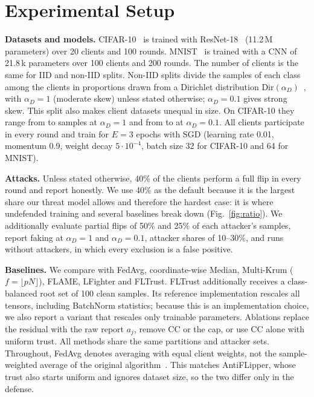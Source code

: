 \documentclass[conference]{IEEEtran}
\begin{document}
\section{Experimental Setup}
\label{sec:setup}
\textbf{Datasets and models.} CIFAR-10~\cite{CIFAR-krizhevsky2009learning} is trained with ResNet-18~\cite{resnet-he2016deep} (11.2\,M parameters) over 20 clients and 100 rounds. MNIST~\cite{MNIST-lecun1998gradient} is trained with a CNN of 21.8\,k parameters over 100 clients and 200 rounds. The number of clients is the same for IID and non-IID splits. Non-IID splits divide the samples of each class among the clients in proportions drawn from a Dirichlet distribution $\mathrm{Dir}(\alpha_D)$~\cite{ferguson1973bayesian}, with $\alpha_D{=}1$ (moderate skew) unless stated otherwise; $\alpha_D{=}0.1$ gives strong skew. This split also makes client datasets unequal in size. On CIFAR-10 they range from \sizeHighMin{} to \sizeHighMax{} samples at $\alpha_D{=}1$ and from \sizeLowMin{} to \sizeLowMax{} at $\alpha_D{=}0.1$. All clients participate in every round and train for $E{=}3$ epochs with SGD (learning rate 0.01, momentum 0.9, weight decay $5\cdot10^{-4}$, batch size 32 for CIFAR-10 and 64 for MNIST).

\textbf{Attacks.} Unless stated otherwise, 40\% of the clients perform a full flip in every round and report honestly. We use 40\% as the default because it is the largest share our threat model allows and therefore the hardest case: it is where undefended training and several baselines break down (Fig.~\ref{fig:ratio}). We additionally evaluate partial flips of 50\% and 25\% of each attacker's samples, report faking at $\alpha_D{=}1$ and $\alpha_D{=}0.1$, attacker shares of 10--30\%, and runs without attackers, in which every exclusion is a false positive.

\textbf{Baselines.} We compare with FedAvg, coordinate-wise Median, Multi-Krum ($f=\lfloor pN\rfloor$), FLAME, LFighter and FLTrust. FLTrust additionally receives a class-balanced root set of 100 clean samples. Its reference implementation rescales all tensors, including BatchNorm statistics; because this is an implementation choice, we also report a variant that rescales only trainable parameters. Ablations replace the residual with the raw report $a_j$, remove CC or the cap, or use CC alone with uniform trust. All methods share the same partitions and attacker sets. Throughout, FedAvg denotes averaging with equal client weights, not the sample-weighted average of the original algorithm~\cite{fedavg-pmlr-v54-mcmahan17a}. This matches AntiFLipper, whose trust also starts uniform and ignores dataset size, so the two differ only in the defense.
\end{document}
